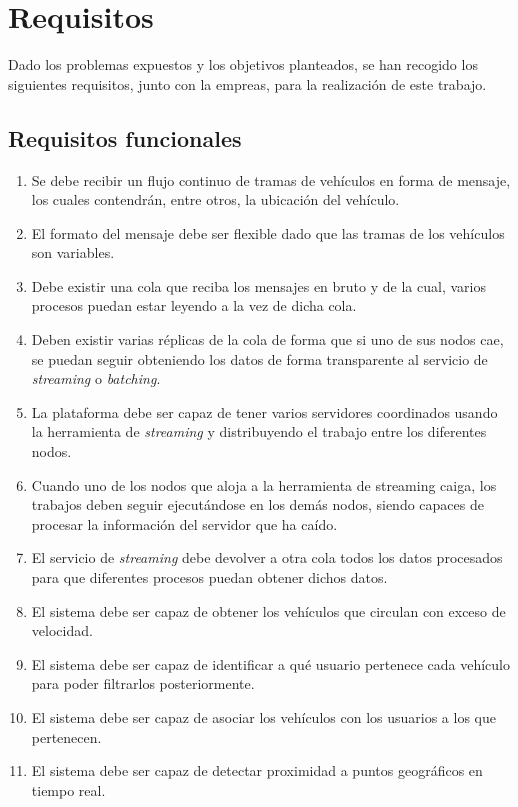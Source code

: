 
\chapter{Requisitos\label{requisitos}}

Dado los problemas expuestos y los objetivos planteados, se han recogido los siguientes requisitos, junto con la empreas, para la realización de este trabajo.

\section{Requisitos funcionales\label{RF}}

\begin{enumerate}
\item Se debe recibir un flujo continuo de tramas de vehículos en forma de
  mensaje, los cuales contendrán, entre otros, la ubicación del vehículo.
\item El formato del mensaje debe ser flexible dado que las tramas de los
  vehículos son variables.
\item Debe existir una cola que reciba los mensajes en bruto y de la cual,
  varios procesos puedan estar leyendo a la vez de dicha cola.
\item Deben existir varias réplicas de la cola de forma que si uno de sus
  nodos cae, se puedan seguir obteniendo los datos de forma transparente al
  servicio de {\em streaming} o {\em batching}.
\item La plataforma debe ser capaz de tener varios servidores coordinados
  usando la herramienta de {\em streaming} y distribuyendo el trabajo entre
  los diferentes nodos.
\item Cuando uno de los nodos que aloja a la herramienta de streaming
  caiga, los trabajos deben seguir ejecutándose en los demás nodos, siendo
  capaces de procesar la información del servidor que ha caído.
\item El servicio de {\em streaming} debe devolver a otra cola todos los
  datos procesados para que diferentes procesos puedan obtener dichos
  datos.
\item El sistema debe ser capaz de obtener los vehículos que circulan con
  exceso de velocidad.
\item El sistema debe ser capaz de identificar a qué usuario pertenece cada
  vehículo para poder filtrarlos posteriormente.
\item El sistema debe ser capaz de asociar los vehículos con los usuarios a
  los que pertenecen.
\item El sistema debe ser capaz de detectar proximidad a
  puntos geográficos en tiempo real.
\end{enumerate}

